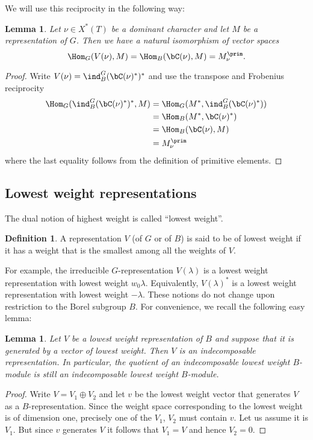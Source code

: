 \documentclass[reqno, 10pt]{amsart}
\theoremstyle{plain}
\newtheorem{lemma}[proposition]{Lemma}
\theoremstyle{definition}
\newtheorem{definition}[proposition]{Definition}
\numberwithin{equation}{section}%
\begin{document}
We will use this reciprocity in the following way:
\begin{lemma}\label{L:basic adjunction}
	Let $\nu\in X^*(T)$ be a dominant character and let $M$ be a representation of $G$.
	Then we have a natural isomorphism of vector spaces
	\[ \Hom_G(V(\nu), M) = \Hom_B(\bC(\nu), M) = M_\nu^{\prim}.\]
\end{lemma}
\begin{proof}
	Write $V(\nu) = \ind_B^G(\bC(\nu)^*)^*$ and use the transpose and Frobenius reciprocity
	\[ 
		\begin{split}
		\Hom_G(\ind_B^G(\bC(\nu)^*)^*, M) &= \Hom_G(M^*,\ind_B^G(\bC(\nu)^*))\\
		&=\Hom_B(M^*,\bC(\nu)^*)\\
		&=\Hom_B(\bC(\nu), M)\\
		&=M_\nu^\prim
		\end{split}
	\]
where the last equality follows from the definition of primitive elements.
\end{proof}

\subsection{Lowest weight representations}
The dual notion of highest weight is called ``lowest weight''.
\begin{definition}\label{D:lowest weight}
A representation $V$ (of $G$ or of $B$) is said to be of lowest weight if it has a weight that is the smallest among all the weights of $V$. 
\end{definition}
For example, the irreducible $G$-representation $V(\lambda)$ is a lowest weight representation with lowest weight $w_0\lambda$.
Equivalently, $V(\lambda)^*$ is a lowest weight representation with lowest weight $-\lambda$.
These notions do not change upon restriction to the Borel subgroup $B$.
For convenience, we recall the following easy lemma:

\begin{lemma}\label{L:lowest weight indec}
Let $V$ be a lowest weight representation of $B$ and suppose that it is generated by a vector of lowest weight.
Then $V$ is an indecomposable representation.
In particular, the quotient of an indecomposable lowest weight $B$-module is still an indecomposable lowest weight $B$-module.
\end{lemma}
\begin{proof}
	Write $V=V_1\oplus V_2$ and let $v$ be the lowest weight vector that generates $V$ as a $B$-representation. Since the weight space corresponding to the lowest weight is of dimension one, precisely one of the $V_1$, $V_2$ must contain $v$. Let us assume it is $V_1$. But since $v$ generates $V$ it follows that $V_1=V$ and hence $V_2=0$. 
\end{proof}
\end{document}
